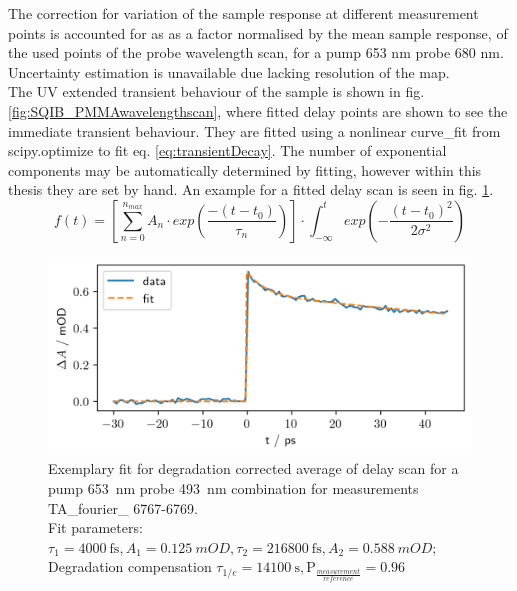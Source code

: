 \documentclass[twoside,openright]{scrreprt}
\begin{document}
The correction for variation of the sample response at different measurement points is accounted for as as a factor normalised by the mean sample response, of the used points of the probe wavelength scan, for a pump 653 nm probe 680 nm. Uncertainty estimation is unavailable due lacking resolution of the map.\\
The UV extended transient behaviour of the sample is shown in fig. \ref{fig:SQIB_PMMAwavelengthscan}, where fitted delay points are shown to see the immediate transient behaviour. They are fitted using a nonlinear curve\_fit from scipy.optimize to fit eq. \ref{eq:transientDecay}. The number of exponential components may be automatically determined by fitting, however within this thesis they are set by hand. An example for a fitted delay scan is seen in fig. \ref{fig:delayFitExample}.
\begin{equation}\label{eq:transientDecay}
f(t) = \left[\sum_{n=0}^{n_{max}} A_n\cdot exp \left(\frac{-(t-t_0)}{\tau_n}\right)\right]\cdot \int_{-\infty}^t exp\left(-\frac{(t-t_0)^2}{2\sigma^2}\right)
\end{equation}

\begin{figure}[hbtp]
\centering
\includegraphics[scale=1]{images/ExemplaryDelayScanFit_Pump653Probe493.png}
\caption{Exemplary fit for degradation corrected average of delay scan for a pump \SI{653}{\nano\meter} probe \SI{493}{\nano\meter} combination for measurements TA\_fourier\_ 6767-6769.\\Fit parameters: $\tau_1 = \SI{4000}{\femto\second}, A_1 = \SI{0.125}{mOD}, \tau_2 = \SI{216800}{\femto\second}, A_2 = \SI{0.588}{mOD}$; Degradation compensation $\tau_{1/e} = \SI{14100}{\second}, \mathrm{P}_{\frac{measurement}{reference}} = 0.96$ \label{fig:delayFitExample}}
\end{figure}
\end{document}
